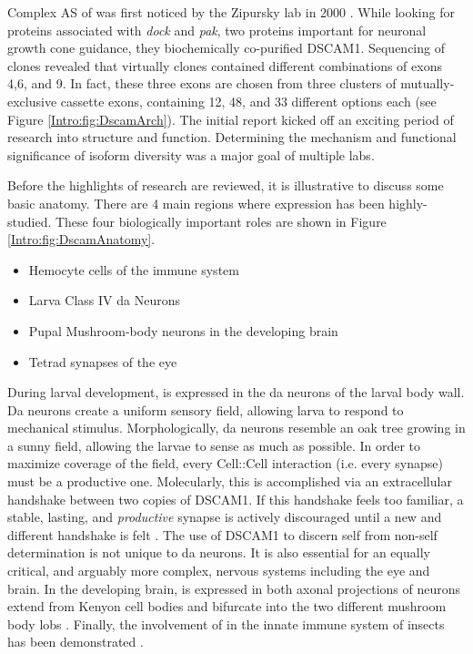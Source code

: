     Complex AS of\dscam{} was first noticed by the Zipursky lab in 2000 \citep{Schmucker2000}. While looking for proteins associated with \textit{dock} and \textit{pak}, two proteins important for neuronal growth cone guidance, they biochemically co-purified DSCAM1. Sequencing of \dscam{} clones revealed that virtually clones contained different combinations of exons 4,6, and 9. In fact, these three exons are chosen from three clusters of mutually-exclusive cassette exons, containing 12, 48, and 33 different options each (see Figure \ref{Intro:fig:DscamArch}). The initial report kicked off an exciting period of research into \dscam{} structure and function. Determining the mechanism and functional significance of \dscam{} isoform diversity was a major goal of multiple labs.

    Before the highlights of \dscam{} research are reviewed, it is illustrative to discuss some basic \flies{} anatomy. There are 4 main regions where \dscam{} expression has been highly-studied. These four biologically important roles are shown in Figure \ref{Intro:fig:DscamAnatomy}.

    \begin{itemize} \itemsep0.5pt \parskip0pt  %
      \item Hemocyte cells of the immune system
      \item Larva Class IV da Neurons 
      \item Pupal Mushroom-body neurons in the developing brain
      \item Tetrad synapses of the eye
      \end{itemize}

    During larval development, \dscam{} is expressed in the da neurons of the larval body wall. Da neurons create a uniform sensory field, allowing larva to respond to mechanical stimulus. Morphologically, da neurons resemble an oak tree growing in a sunny field, allowing the larvae to sense as much as possible. In order to maximize coverage of the field, every Cell::Cell interaction (i.e. every synapse) must be a productive one. Molecularly, this is accomplished via an extracellular handshake between two copies of DSCAM1. If this handshake feels too familiar, a stable, lasting, and \textit{productive} synapse is actively discouraged until a new and different handshake is felt \citep{Wojtowicz2004}. The use of DSCAM1 to discern self from non-self determination is not unique to da neurons. It is also essential for an equally critical, and arguably more complex, nervous systems including the eye and brain. In the developing brain, \dscam{} is expressed in both axonal projections of neurons extend from Kenyon cell bodies and bifurcate into the two different mushroom body lobs \citep{Zhan2004}. Finally, the involvement of \dscam{} in the innate immune system of insects has been demonstrated \citep{Watson2005,Dong2006}.

